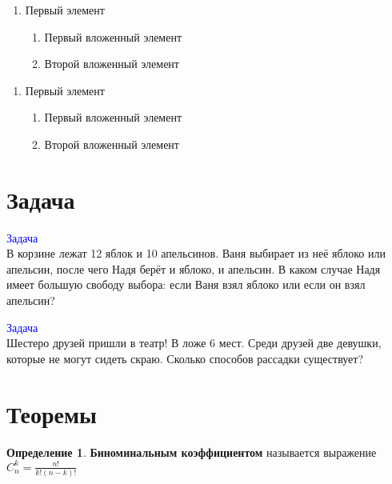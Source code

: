 \documentclass[12pt, a4paper]{article}
\theoremstyle{plain}              %
\theoremstyle{definition}         %
\newtheorem*{defin}{Определение}  %
\begin{document}
\begin{enumerate}
\item Первый элемент
  \begin{enumerate}
  \item Первый вложенный элемент
  \item Второй вложенный элемент
  \end{enumerate}
\end{enumerate}

\renewcommand{\labelenumi}{\arabic{enumi}}
\renewcommand{\labelenumii}{\arabic{enumi}.\arabic{enumii}}

\begin{enumerate}
\item Первый элемент
  \begin{enumerate}
  \item Первый вложенный элемент
  \item Второй вложенный элемент
  \end{enumerate}
\end{enumerate}



\section{Задача}

\newcommand{\ex}[1]{%
\addtocounter{i}{1}    %
\textcolor{blue}{Задача \\}
#1\\
}


\ex{В корзине лежат 12 яблок и 10 апельсинов. Ваня выбирает из неё яблоко или апельсин, после чего Надя берёт и яблоко, и апельсин. В каком случае Надя имеет большую свободу выбора: если Ваня взял яблоко или если он взял апельсин?}

\ex{Шестеро друзей пришли в театр! В ложе 6 мест. Среди друзей две девушки, которые не могут сидеть скраю. Сколько способов рассадки существует?}



\section{Теоремы}
\begin{defin}
\textbf{ Биноминальным коэффициентом} называется выражение $C_n^k = \frac{n!}{k!(n-k)!}$
\end{defin}
\end{document}
